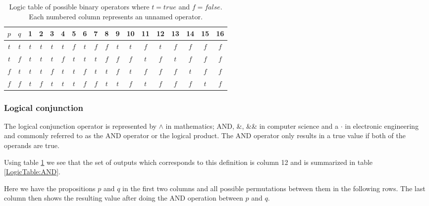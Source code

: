             
            \begin{table}[h!]
                \centering
                \begin{tabular}{|c|c||c|c|c|c|c|c|c|c|c|c|c|c|c|c|c|c|}
                	\hline
                	$p$ & $q$ &  1  &  2  &  3  &  4  &  5  &  6  &  7  &  8  &  9  & 10  & 11  & 12  & 13  & 14  & 15  & 16  \\ \hline
                	$t$ & $t$ & $t$ & $t$ & $t$ & $t$ & $f$ & $t$ & $f$ & $f$ & $t$ & $t$ & $f$ & $t$ & $f$ & $f$ & $f$ & $f$ \\ \hline
                	$t$ & $f$ & $t$ & $t$ & $t$ & $f$ & $t$ & $t$ & $t$ & $f$ & $f$ & $f$ & $t$ & $f$ & $t$ & $f$ & $f$ & $f$ \\ \hline
                	$f$ & $t$ & $t$ & $t$ & $f$ & $t$ & $t$ & $f$ & $t$ & $t$ & $f$ & $t$ & $f$ & $f$ & $f$ & $t$ & $f$ & $f$ \\ \hline
                	$f$ & $f$ & $t$ & $f$ & $t$ & $t$ & $t$ & $f$ & $f$ & $t$ & $t$ & $f$ & $t$ & $f$ & $f$ & $f$ & $t$ & $f$ \\ \hline
                \end{tabular} 
                \caption{Logic table of possible binary operators where $t=true$ and $f=false$. Each numbered column represents an unnamed operator.}
                \label{LogicTable:PossibleOperators}
            \end{table}
        
            \subsubsection{Logical conjunction}
        
                The logical conjunction operator is represented by $\wedge$ in mathematics; AND, \&, \&\& in computer science and a $\cdot$ in electronic engineering and commonly referred to as the AND operator or the logical product. The AND operator only results in a true value if both of the operands are true.
                
                Using table \ref{LogicTable:PossibleOperators} we see that the set of outputs which corresponds to this definition is column 12 and is summarized in table \ref{LogicTable:AND}. 
                
                Here we have the propositions $p$ and $q$ in the first two columns and all possible permutations between them in the following rows. The last column then shows the resulting value after doing the AND operation between $p$ and $q$. 
                
